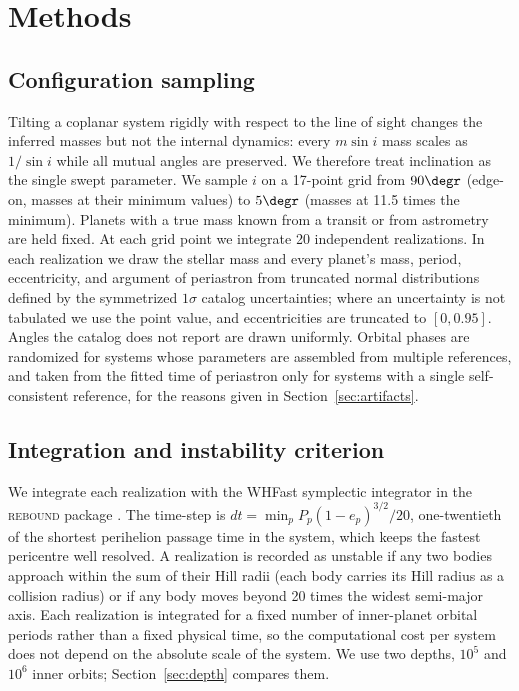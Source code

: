\documentclass[fleqn,usenatbib]{mnras}
\newcommand{\msini}{m\sin i}
\begin{document}
\section{Methods} \label{sec:methods}

\subsection{Configuration sampling} \label{sec:sampling}

Tilting a coplanar system rigidly with respect to the line of sight
changes the inferred masses but not the internal dynamics: every $\msini$
mass scales as $1/\sin i$ while all mutual angles are preserved. We
therefore treat inclination as the single swept parameter. We sample $i$
on a 17-point grid from $90\degr$ (edge-on, masses at their minimum
values) to $5\degr$ (masses at 11.5 times the minimum). Planets with a
true mass known from a transit or from astrometry are held fixed. At each
grid point we integrate 20 independent realizations. In each realization
we draw the stellar mass and every planet's mass, period, eccentricity,
and argument of periastron from truncated normal distributions defined by
the symmetrized $1\sigma$ catalog uncertainties; where an uncertainty is
not tabulated we use the point value, and eccentricities are truncated to
$[0, 0.95]$. Angles the catalog does not report are drawn uniformly.
Orbital phases are randomized for systems whose parameters are assembled
from multiple references, and taken from the fitted time of periastron
only for systems with a single self-consistent reference, for the reasons
given in Section~\ref{sec:artifacts}.

\subsection{Integration and instability criterion}
\label{sec:integration}

We integrate each realization with the WHFast symplectic integrator
\citep{ReinTamayo2015} in the \textsc{rebound} package \citep{ReinLiu2012}.
The time-step is $dt = \min_p P_p (1-e_p)^{3/2} / 20$, one-twentieth of
the shortest perihelion passage time in the system, which keeps the
fastest pericentre well resolved. A realization is recorded as unstable if
any two bodies approach within the sum of their Hill radii (each body
carries its Hill radius as a collision radius) or if any body moves beyond
20 times the widest semi-major axis. Each realization is integrated for a
fixed number of inner-planet orbital periods rather than a fixed physical
time, so the computational cost per system does not depend on the absolute
scale of the system. We use two depths, $10^5$ and $10^6$ inner orbits;
Section~\ref{sec:depth} compares them.
\end{document}
